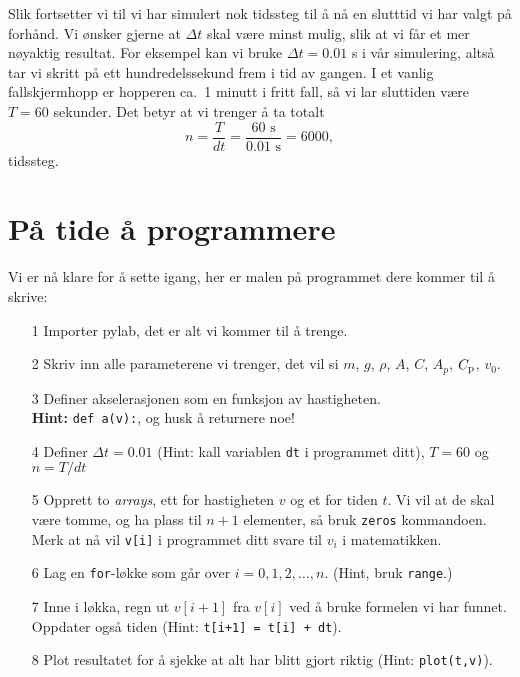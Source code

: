 \documentclass[a4paper, 11pt, notitlepage]{article}
\begin{document}
Slik fortsetter vi til vi har simulert nok tidssteg til å nå en slutttid vi har valgt på forhånd. Vi ønsker gjerne at $\Delta t$ skal være minst mulig, slik at vi får et mer nøyaktig resultat. For eksempel kan vi bruke $\Delta t = 0.01$ s i vår simulering, altså tar vi skritt på ett hundredelssekund frem i tid av gangen. I et vanlig fallskjermhopp er hopperen ca.\ 1 minutt i fritt fall, så vi lar sluttiden være $T=60$ sekunder. Det betyr at vi trenger å ta totalt
$$n = \frac{T}{dt} = \frac{60 \mbox{ s}}{0.01 \mbox{ s}} = 6000,$$
tidssteg.

\clearpage 

\section*{På tide å programmere}

Vi er nå klare for å sette igang, her er malen på programmet dere kommer til å skrive:
\begin{itemize}
    \item[1] Importer pylab, det er alt vi kommer til å trenge.
    \item[2] Skriv inn alle parameterene vi trenger, det vil si $m$, $g$, $\rho$, $A$, $C$, $A_{p}$, $C_{\rm p}$, $v_0$.
    \item[3] Definer akselerasjonen som en funksjon av hastigheten. \\
    \textbf{Hint:} \verb+def a(v):+, og husk å returnere noe!
    \item[4] Definer $\Delta t = 0.01$ (Hint: kall variablen \verb+dt+ i programmet ditt), $T=60$ og $n = T/dt$
    \item[5] Opprett to \emph{arrays}, ett for hastigheten $v$ og et for tiden $t$. Vi vil at de skal være tomme, og ha plass til $n+1$ elementer, så bruk \verb+zeros+ kommandoen. Merk at nå vil \verb+v[i]+ i programmet ditt svare til $v_i$ i matematikken.
    \item[6] Lag en \verb+for+-løkke som går over $i=0,1,2,\ldots,n$. (Hint, bruk \verb+range+.)
    \item[7] Inne i løkka, regn ut $v[i+1]$ fra $v[i]$ ved å bruke formelen vi har funnet. Oppdater også tiden (Hint: \verb!t[i+1] = t[i] + dt!).
    \item[8] Plot resultatet for å sjekke at alt har blitt gjort riktig (Hint: \verb+plot(t,v)+).
\end{itemize}
\end{document}
